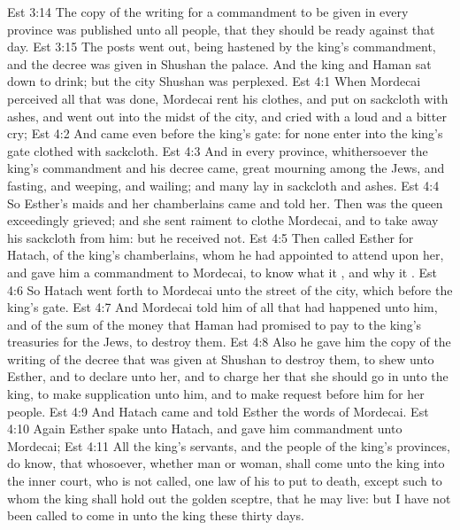 \vs Est 3:14 The copy of the writing for a commandment to be given in every province was published unto all people, that they should be ready against that day.
\vs Est 3:15 The posts went out, being hastened by the king's commandment, and the decree was given in Shushan the palace. And the king and Haman sat down to drink; but the city Shushan was perplexed.
\vs Est 4:1 When Mordecai perceived all that was done, Mordecai rent his clothes, and put on sackcloth with ashes, and went out into the midst of the city, and cried with a loud and a bitter cry;
\vs Est 4:2 And came even before the king's gate: for none  enter into the king's gate clothed with sackcloth.
\vs Est 4:3 And in every province, whithersoever the king's commandment and his decree came,  great mourning among the Jews, and fasting, and weeping, and wailing; and many lay in sackcloth and ashes.
\vs Est 4:4 So Esther's maids and her chamberlains came and told  her. Then was the queen exceedingly grieved; and she sent raiment to clothe Mordecai, and to take away his sackcloth from him: but he received  not.
\vs Est 4:5 Then called Esther for Hatach,  of the king's chamberlains, whom he had appointed to attend upon her, and gave him a commandment to Mordecai, to know what it , and why it .
\vs Est 4:6 So Hatach went forth to Mordecai unto the street of the city, which  before the king's gate.
\vs Est 4:7 And Mordecai told him of all that had happened unto him, and of the sum of the money that Haman had promised to pay to the king's treasuries for the Jews, to destroy them.
\vs Est 4:8 Also he gave him the copy of the writing of the decree that was given at Shushan to destroy them, to shew  unto Esther, and to declare  unto her, and to charge her that she should go in unto the king, to make supplication unto him, and to make request before him for her people.
\vs Est 4:9 And Hatach came and told Esther the words of Mordecai.
\vs Est 4:10 Again Esther spake unto Hatach, and gave him commandment unto Mordecai;
\vs Est 4:11 All the king's servants, and the people of the king's provinces, do know, that whosoever, whether man or woman, shall come unto the king into the inner court, who is not called,  one law of his to put  to death, except such to whom the king shall hold out the golden sceptre, that he may live: but I have not been called to come in unto the king these thirty days.

